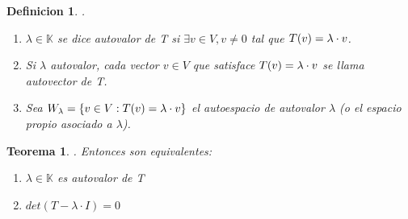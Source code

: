 \documentclass[]{article}
\newtheorem{theorem}{Teorema}
\newtheorem{definition}{Definicion}
\newcommand{\K}{
    \mathbb{K}
}
\begin{document}
\newpage

\begin{definition}
    .
    \begin{enumerate}
        \item $\lambda \in \K$ se dice autovalor de T si $\exists v \in V , v\neq0$ tal que $\text{$T({v})$}=\lambda\cdot v$.
        \item Si $\lambda$ autovalor, cada vector $v\in V$ que satisface $\text{$T({v})$}=\lambda\cdot v$ se llama
        autovector de T.
        \item Sea $W_\lambda = \text{$\{ {v\in V : \text{$T({v})$}=\lambda\cdot v} \}$}$ el autoespacio de autovalor $\lambda$
        (o el espacio propio asociado a $\lambda$). 
    \end{enumerate}
\end{definition}
\begin{theorem}
    . Entonces son equivalentes:
    \begin{enumerate}
        \item $\lambda \in \K$ es autovalor de T
        \item $det(T-\lambda\cdot I)=0$
    \end{enumerate}
\end{theorem}
\end{document}
